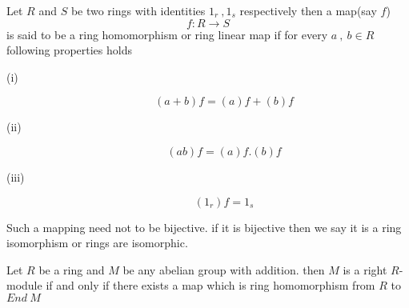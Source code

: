 \begin{defn}
	Let $R$ and $S$ be two rings with identities $1_r \ , 1_s$ respectively then a map(say $f$)
	\begin{equation*}
	f : R \rightarrow S
	\end{equation*}
	is said to be a ring homomorphism or ring linear map if for every $a \ ,\ b \in R$ following properties holds
	\begin{description}
		\item[(i) ]\begin{equation*}
		(a+b)f = (a)f +(b)f
		\end{equation*}
		\item[(ii)  ]\begin{equation*}
		(ab)f = (a)f . (b)f
		\end{equation*}
		\item[(iii) ]\begin{equation*}
		(1_r)f = 1_s
		\end{equation*}
	\end{description}
\end{defn}
\begin{remark}
	Such a mapping need not to be bijective. if it is bijective then we say it is a ring isomorphism or rings are isomorphic.
\end{remark}
\bigskip
\begin{thm}
	Let $R$ be a ring and $M$ be any abelian group with addition. then $M$ is a right $R$-module if and only if there exists a map which is ring homomorphism from $R$ to $End \ M$
\end{thm}
